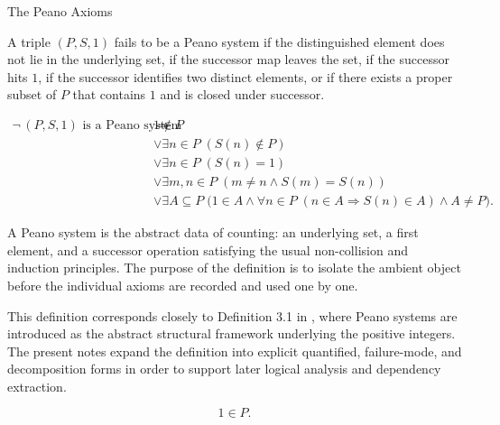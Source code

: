 \begin{topicbox}{The Peano Axioms}
\begin{remark*}
A triple $(P,S,1)$ fails to be a Peano system if the distinguished element
does not lie in the underlying set, if the successor map leaves the set, if
the successor hits $1$, if the successor identifies two distinct elements, or
if there exists a proper subset of $P$ that contains $1$ and is closed under
successor.
\end{remark*}

\begin{remark*}
\[
\begin{aligned}
\neg\,\text{$(P,S,1)$ is a Peano system}
\Longrightarrow\;&
1 \notin P \\
&\lor \exists n \in P\;(S(n) \notin P) \\
&\lor \exists n \in P\;(S(n)=1) \\
&\lor \exists m,n \in P\;(m \neq n \land S(m)=S(n)) \\
&\lor \exists A \subseteq P\;
\bigl(1 \in A \land
\forall n \in P\;(n \in A \Longrightarrow S(n) \in A)
\land A \neq P\bigr).
\end{aligned}
\]
\end{remark*}

\begin{remark*}[Interpretation]
A Peano system is the abstract data of counting: an underlying set, a first
element, and a successor operation satisfying the usual non-collision and
induction principles. The purpose of the definition is to isolate the ambient
object before the individual axioms are recorded and used one by one.
\end{remark*}

\begin{remark*}
This definition corresponds closely to Definition 3.1 in
\citet{FefermanNumberSystems1964}, where Peano systems are introduced as the
abstract structural framework underlying the positive integers. The present
notes expand the definition into explicit quantified, failure-mode, and
decomposition forms in order to support later logical analysis and dependency
extraction.
\end{remark*}

\NoLocalDependencies

\begin{tcolorbox}[colback=axiombox, colframe=axiomborder, arc=2pt,
  left=6pt, right=6pt, top=4pt, bottom=4pt,
  title={\small\textbf{Axiom (One Is a Natural Number)}},
  fonttitle=\small\bfseries]
\begin{axiom}
\label{ax:peano-one-in-n}
\[
1 \in P.
\]
\end{axiom}
\end{tcolorbox}


\end{topicbox}
